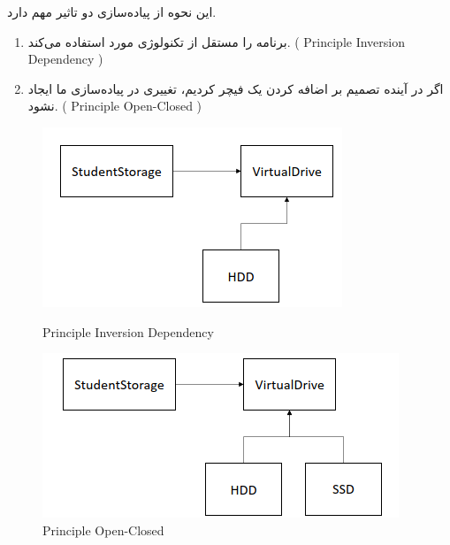 \begin{flushright}
    \newpage
    این نحوه از پیاده‌سازی دو تاثیر مهم دارد.
    \begin{enumerate}
        \item برنامه را مستقل از تکنولوژی مورد استفاده می‌کند. ( Principle Inversion Dependency   )
        \item اگر در آینده تصمیم بر اضافه کردن یک فیچر کردیم، تغییری در پیاده‌سازی ما ایجاد نشود. ( Principle Open-Closed )
    \end{enumerate}

    \begin{figure}[H]
        \includegraphics[width=\linewidth]{source/DIP}
        \caption{Principle Inversion Dependency}\label{fig:DIP}
        \endminipage\hfill
        \includegraphics[width=\linewidth]{source/OCP}
        \caption{Principle Open-Closed}\label{fig:OCP}
        \endminipage\hfill
    \end{figure}

\end{flushright}
